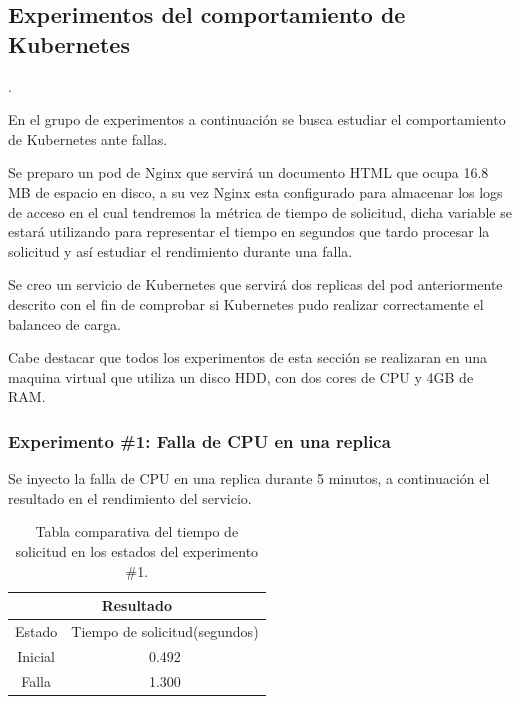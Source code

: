 \subsection{Experimentos del comportamiento de Kubernetes}

.


\par En el grupo de experimentos a continuación se busca estudiar el comportamiento de Kubernetes ante fallas.\\ 

\par Se preparo un pod de Nginx que servirá un documento HTML que ocupa 16.8 MB de espacio en disco, a su vez Nginx esta configurado para almacenar los logs de acceso en el cual tendremos la métrica de tiempo de solicitud, dicha variable se estará utilizando para representar el tiempo en segundos que tardo procesar la solicitud y así estudiar el rendimiento durante una falla.\\

\par Se creo un servicio de Kubernetes que servirá dos replicas del pod anteriormente descrito con el fin de comprobar si Kubernetes pudo realizar correctamente el balanceo de carga.\\

\par Cabe destacar que todos los experimentos de esta sección se realizaran en una maquina virtual que utiliza un disco HDD, con dos cores de CPU y 4GB de RAM.\\

\subsubsection{Experimento \#1: Falla de CPU en una replica}

\par Se inyecto la falla de CPU en una replica durante 5 minutos, a continuación el resultado en el rendimiento del servicio.\\
\begin{table}[ht!]
\begin{center}
\begin{tabular}{ |c|c| } 
 \hline
 \multicolumn{2}{|c|}{Resultado} \\
 \hline
 \hline
 Estado & Tiempo de solicitud(segundos)\\
 \hline
 Inicial & 0.492\\
 Falla & 1.300\\
 \hline
\end{tabular}
\end{center}
\caption{Tabla comparativa del tiempo de solicitud en los estados del experimento \#1.}
\label{tab:tabla45}
\end{table}


